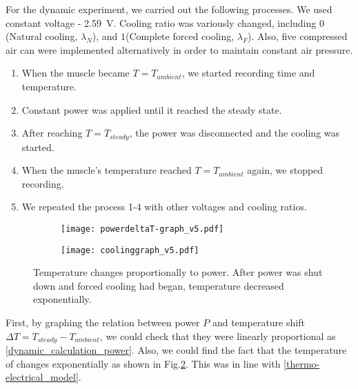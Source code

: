 For the dynamic experiment, we carried out the following processes. We used constant voltage - \SI{2.59}{\volt}. Cooling ratio was variously changed, including $0$(Natural cooling, $\lambda_{N}$), and $1$(Complete forced cooling, $\lambda_{F}$). Also, five compressed air can were implemented alternatively in order to maintain constant air pressure. 
\begin{enumerate}
\item When the muscle became $T=T_{ambient}$, we started recording time and temperature.
\item Constant power was applied until it reached the steady state.
\item After reaching $T=T_{steady}$, the power was disconnected and the cooling was started. 
\item When the muscle's temperature reached $T=T_{ambient}$ again, we stopped recording. 
\item We repeated the process 1-4 with other voltages and cooling ratios.
\end{enumerate}


\begin{figure}[t]
	\centering
	\begin{subfigure}[t]{0.45\linewidth}
		\centering\texttt{[image: powerdeltaT-graph\_v5.pdf]}
		\caption{\label{powerdeltaT}}
	\end{subfigure}%
	\begin{subfigure}[t]{0.45\linewidth}
		\centering\texttt{[image: coolinggraph\_v5.pdf]}
		\caption{\label{coolinggraph}}
	\end{subfigure}
	\caption[Results of dynamic experiment]{ Temperature changes proportionally to power.  After power was shut down and forced cooling had began, temperature decreased exponentially.}
	\label{result_dynamic}
\end{figure}

First, by graphing the relation between power $P$ and temperature shift $\Delta{T}=T_{steady}-T_{ambient}$, we could check that they were linearly proportional as \eqref{dynamic_calculation_power}.
Also, we could find the fact that the temperature of \scp changes exponentially as shown in Fig.\ref{coolinggraph}. This was in line with  \eqref{thermo-electrical_model}.

